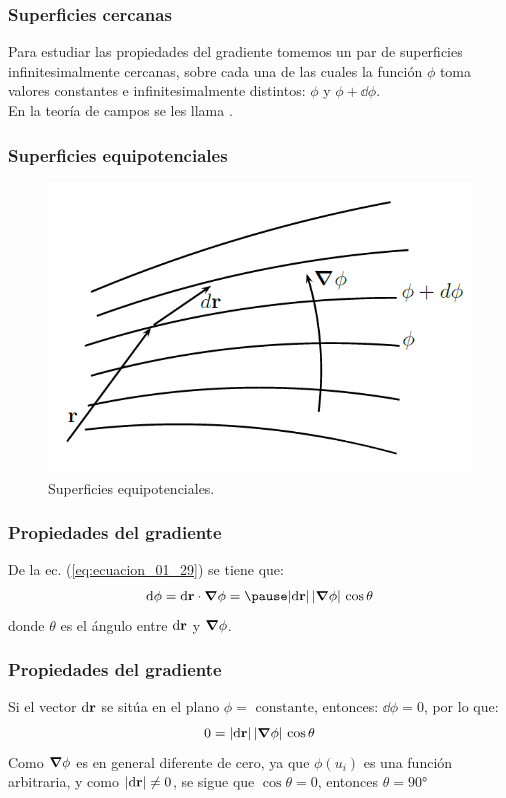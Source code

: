 \documentclass[12pt]{beamer}
\begin{document}
\begin{frame}
\frametitle{Superficies cercanas}
Para estudiar las propiedades del gradiente tomemos un par de superficies infinitesimalmente cercanas, sobre cada una de las cuales la función $\phi$ toma valores constantes e infinitesimalmente distintos: $\phi$ y $\phi + \dd{\phi}$.
\\
\bigskip
\pause
En la teoría de campos se les llama .
\end{frame}
\begin{frame}
\frametitle{Superficies equipotenciales}
\begin{figure}[h!]
    \centering
    \includegraphics[scale=0.5]{Imagenes/Superficies_Equipotenciales.png}
    \caption{Superficies equipotenciales.}
    \label{fig:Superficies_Equipotenciales}
\end{figure}
\end{frame}
\begin{frame}
\frametitle{Propiedades del gradiente}
De la ec. (\ref{eq:ecuacion_01_29}) se tiene que:
\pause
\begin{eqnarray*}
\dd{\phi} = \dd{\vb{r}} \cdot \grad{\phi} = \pause \abs{\dd{\vb{r}}} \, \abs{\grad{\phi}} \, \cos \theta
\end{eqnarray*}
donde $\theta$ es el ángulo entre $\dd{\vb{r}}$ y $\grad{\phi}$.
\end{frame}
\begin{frame}
\frametitle{Propiedades del gradiente}
Si el vector $\dd{\vb{r}}$ se sitúa en el plano $\phi = \text{ constante}$, entonces: $\dd{\phi} = 0$, por lo que:
\pause
\begin{align*}
0 = \abs{\dd{\vb{r}}} \, \abs{\grad{\phi}} \, \cos \theta
\end{align*}
\pause
Como $\grad{\phi}$ es en general diferente de cero, ya que $\phi(u_{i})$ es una función arbitraria, y como $\abs{\dd{\vb{r}}} \neq 0$, se sigue que $\cos \theta = 0$, entonces $\theta = \ang{90}$
\end{frame}
\end{document}
